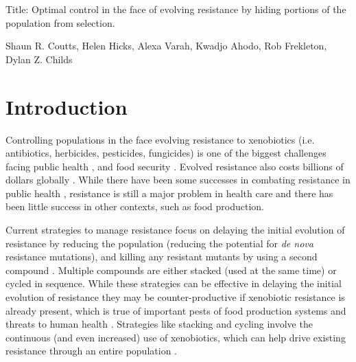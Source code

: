 \documentclass[12pt, a4paper]{article}
\begin{document}
Title: Optimal control in the face of evolving resistance by hiding portions of the population from selection.

Shaun R. Coutts, Helen Hicks, Alexa Varah, Kwadjo Ahodo, Rob Frekleton, Dylan Z. Childs 

\section*{Introduction}
Controlling populations in the face evolving resistance to xenobiotics (i.e. antibiotics, herbicides, pesticides, fungicides) is one of the biggest challenges facing public health \citep{Laxm2016, Willy2017}, and food security \citep{Denh1992, Palu2001, Hick2018}. Evolved resistance also costs billions of dollars globally \citep{Livi2016, Ches2018, Hick2018}. While there have been some successes in combating resistance in public health \citep{REX2013}, resistance is still a major problem in health care \citep{Willy2017} and there has been little success in other contexts, such as food production.

Current strategies to manage resistance focus on delaying the initial evolution of resistance by reducing the population (reducing the potential for \textit{de nova} resistance mutations), and killing any resistant mutants by using a second compound \citep{Denh1992, REX2013}. Multiple compounds are either stacked (used at the same time) or cycled in sequence. While these strategies can be effective in delaying the initial evolution of resistance they may be counter-productive if xenobiotic resistance is already present, which is true of important pests of food production systems \citep{Denh1992, Hick2018} and threats to human health \citep{Willy2017}. Strategies like stacking and cycling involve the continuous (and even increased) use of xenobiotics, which can help drive existing resistance through an entire population \citep{Denh1992, Hick2018}.
\end{document}
